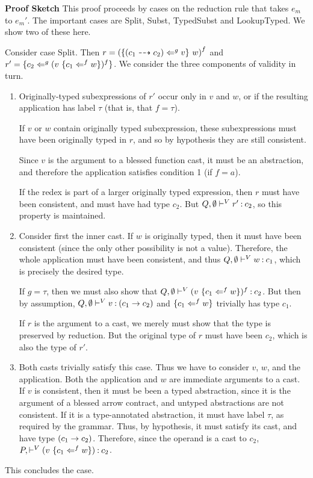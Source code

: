 {\noindent\textbf{Proof Sketch}
This proof proceeds by cases on the reduction rule that takes $e_m$ to
$e_m'$.  The important cases are {\sc Split}, {\sc Subst}, {\sc
  TypedSubst} and {\sc LookupTyped}.  We show two of these here.

Consider case {\sc Split}.  Then $r =
{\comb{\cast{\barrcnt{c_1}{c_2}}{g}{v}}{w}}^f$ and $r' =
\cast{c_2}{g}{\comb{v}{\cast{c_1}{f}{w}}^f}$.  We consider the three
components of validity in turn.
\begin{enumerate}
\item Originally-typed
  subexpressions of $r'$ occur only in $v$ and $w$, or if the
  resulting application has label $\tau$ (that is, that $f = \tau$). 

  If $v$ or $w$ contain
  originally typed subexpression, these subexpressions must have been
  originally typed in $r$, and so by
  hypothesis they are still consistent.  

  Since $v$ is the argument to a blessed function cast, it must be an
  abstraction, and therefore the application satisfies condition 1 (if
  $f = a$).

  If the redex is part of
  a larger originally typed expression, then $r$ must have been consistent, and
  must have had type $c_2$.  But $\mtypejg[Q]{\emptyset}{r'}{c_2}$, so this
  property is maintained. 


\item  Consider first the inner cast.
  If $w$ is originally typed, then it must have been consistent (since the only
  other possibility is not a value).  Therefore, the whole application
  must have been consistent, and thus $\mtypejg[Q]{\emptyset}{w}{c_1}$, which is
  precisely the desired type.  

If $g = \tau$, then we must also show that
$\mtypejg[Q]{\emptyset}{{\comb{v}{\cast{c_1}{f}{w}}^f}}{c_2}$. But then by
assumption, $\mtypejg[Q]{\emptyset}{v}{\dlsproctype{c_1}{c_2}}$ and
$\cast{c_1}{f}{w}$ trivially has type $c_1$.

If $r$ is the argument to a cast, we merely
must show that the type is preserved by reduction.  But the original
type of $r$ must have been $c_2$, which is also the type of $r'$.


\item Both casts trivially satisfy this case.  Thus we have to
  consider $v$, $w$, and the application.  Both the application and
  $w$ are immediate arguments to a cast.  If $v$ is consistent, then it
  must be been a typed abstraction, since it is the argument of a
  blessed arrow contract, and untyped abstractions are not consistent.
  If it is a type-annotated abstraction, it must have label $\tau$,
  as required by the grammar.
  Thus, by hypothesis, it must satisfy its cast, and have type
  $\dlsproctype{c_1}{c_2}$.  Therefore, since the operand is a cast to
  $c_2$, $\mtypejg{}{\comb{v}{\cast{c_1}{f}{w}}}{c_2}$.
\end{enumerate}
This concludes the case.  

}

